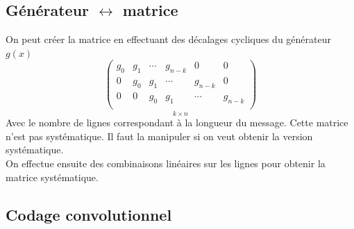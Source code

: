 \documentclass[resume.tex]{subfiles}
\begin{document}
\subsection{Générateur $\leftrightarrow$ matrice}
On peut créer la matrice en effectuant des décalages cycliques du générateur $g(x)$
$$\underset{k\times n}{\begin{pmatrix}
g_0 & g_1 & \cdots & g_{n-k} & 0 & 0\\
0 & g_0 & g_1 & \cdots & g_{n-k} & 0\\
0 & 0 & g_0 & g_1 & \cdots & g_{n-k}\\
\end{pmatrix}}$$
Avec le nombre de lignes correspondant à la longueur du message. Cette matrice n'est pas systématique. Il faut la manipuler si on veut obtenir la version systématique.\\
On effectue ensuite des combinaisons linéaires sur les lignes pour obtenir la matrice systématique.
\subsection{Codage convolutionnel}
\end{document}
